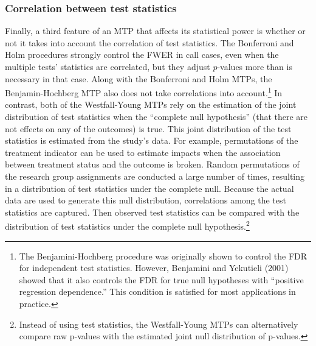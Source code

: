 \documentclass[
]{article}
\begin{document}
\subsubsection{Correlation between test statistics}
\label{sec:corr}

Finally, a third feature of an MTP that affects its statistical power is
whether or not it takes into account the correlation of test statistics.
The Bonferroni and Holm procedures strongly control the FWER in call
cases, even when the multiple tests' statistics are correlated, but they
adjust \(p\)-values more than is necessary in that case. Along with the
Bonferroni and Holm MTPs, the Benjamin-Hochberg MTP also does not take
correlations into
account.\footnote{The Benjamini-Hochberg procedure was originally shown to control the FDR for independent test statistics. However, Benjamini and Yekutieli (2001) showed that it also controls the FDR for true null hypotheses with “positive regression dependence.” This condition is satisfied
for most applications in practice.} In contrast, both of the
Westfall-Young MTPs rely on the estimation of the joint distribution of
test statistics when the ``complete null hypothesis'' (that there are
not effects on any of the outcomes) is true. This joint distribution of
the test statistics is estimated from the study's data. For example,
permutations of the treatment indicator can be used to estimate impacts
when the association between treatment status and the outcome is broken.
Random permutations of the research group assignments are conducted a
large number of times, resulting in a distribution of test statistics
under the complete null. Because the actual data are used to generate
this null distribution, correlations among the test statistics are
captured. Then observed test statistics can be compared with the
distribution of test statistics under the complete null
hypothesis.\footnote{Instead of using test statistics, the Westfall-Young MTPs can alternatively compare raw p-values with the estimated joint null distribution of p-values.}
\end{document}
